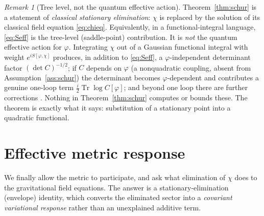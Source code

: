 \documentclass[11pt,reqno]{amsart}
\numberwithin{equation}{section}
\theoremstyle{plain}
\theoremstyle{definition}
\theoremstyle{remark}
\newtheorem{remark}[theorem]{Remark}
\begin{document}
\begin{remark}[Tree level, not the quantum effective action]
\label{rem:treelevel}
Theorem~\ref{thm:schur} is a statement of \emph{classical stationary elimination}: $\chi$ is
replaced by the solution of its classical field equation \eqref{eq:chieq}. Equivalently, in a
functional-integral language, \eqref{eq:Seff} is the tree-level (saddle-point) contribution.
It is \emph{not} the quantum effective action for $\varphi$. Integrating $\chi$ out of a
Gaussian functional integral with weight $e^{iS[\varphi,\chi]}$ produces, in addition to
\eqref{eq:Seff}, a $\varphi$-independent determinant factor $(\det C)^{-1/2}$; if $C$ depends
on $\varphi$ (a nonquadratic coupling, absent from Assumption~\ref{ass:schur}) the determinant
becomes $\varphi$-dependent and contributes a genuine one-loop term
$\tfrac{i}{2}\operatorname{Tr}\log C[\varphi]$; and beyond one loop there are further
corrections \cite{Peskin,Weinberg2}. Nothing in Theorem~\ref{thm:schur} computes or bounds
these. The theorem is exactly what it says: substitution of a stationary point into a quadratic
functional.
\end{remark}

\section{Effective metric response}
\label{sec:metric}

We finally allow the metric to participate, and ask what elimination of $\chi$ does to the
gravitational field equations. The answer is a stationary-elimination (envelope) identity,
which converts the eliminated sector into a \emph{covariant variational response} rather than
an unexplained additive term.
\end{document}
